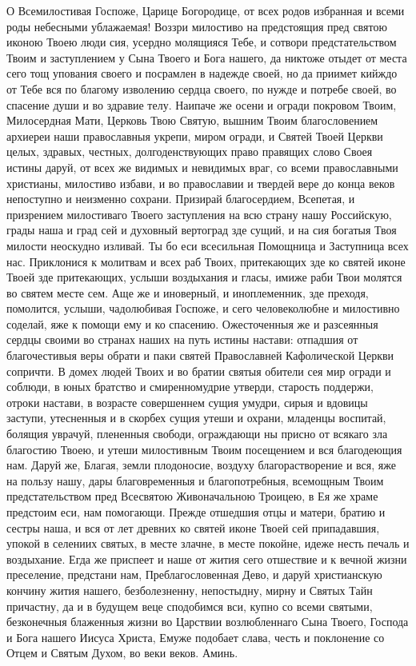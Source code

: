 \mychapterending

\begin{mymulticols}

О Всемилостивая Госпоже, Царице Богородице, от всех родов избранная и всеми роды небесными ублажаемая! Воззри милостиво на предстоящия пред святою иконою Твоею люди сия, усердно молящияся Тебе, и сотвори предстательством Твоим и заступлением у Сына Твоего и Бога нашего, да никтоже отыдет от места сего тощ упования своего и посрамлен в надежде своей,  но да приимет кийждо от Тебе вся по благому изволению сердца своего, по нужде и потребе своей, во спасение души и во здравие телу. Наипаче же осени и огради покровом Твоим, Милосердная Мати, Церковь Твою Святую, вышним Твоим благословением архиереи наши православныя укрепи, миром огради, и Святей Твоей Церкви целых, здравых, честных, долгоденствующих право правящих слово Своея истины даруй, от всех же видимых и невидимых враг, со всеми православными христианы, милостиво избави, и во православии и твердей вере до конца веков непоступно и неизменно сохрани. Призирай благосердием, Всепетая, и призрением милостиваго Твоего заступления на всю страну нашу Российскую, грады наша и град сей и духовный вертоград зде сущий, и на сия богатыя Твоя милости неоскудно изливай. Ты бо еси всесильная Помощница и Заступница всех нас. Приклонися к молитвам и всех раб Твоих, притекающих зде ко святей иконе Твоей зде притекающих, услыши воздыхания и гласы, имиже раби Твои молятся во святем месте сем. Аще же и иноверный, и иноплеменник, зде преходя, помолится, услыши, чадолюбивая Госпоже, и сего человеколюбне и милостивно соделай, яже к помощи ему и ко спасению. Ожесточенныя же и разсеянныя сердцы своими во странах наших на путь истины настави: отпадшия от благочестивыя веры обрати и паки святей Православней Кафолической Церкви сопричти. В домех людей Твоих и во братии святыя обители сея  мир огради и соблюди, в юных братство и смиренномудрие утверди, старость поддержи, отроки настави, в возрасте совершеннем сущия умудри, сирыя и вдовицы заступи, утесненныя и в скорбех сущия утеши и охрани, младенцы воспитай, болящия уврачуй, плененныя свободи, ограждающи ны присно от всякаго зла благостию Твоею, и утеши милостивным Твоим посещением и вся благодеющия нам. Даруй же, Благая, земли плодоносие, воздуху благорастворение и вся, яже на пользу нашу, дары благовременныя и благопотребныя, всемощным Твоим предстательством пред Всесвятою Живоначальною Троицею, в Ея же храме предстоим еси, нам помогающи. Прежде отшедшия отцы и матери, братию и сестры наша, и вся от лет древних ко святей иконе Твоей сей припадавшия, упокой в селениих святых, в месте злачне, в месте покойне, идеже несть печаль и воздыхание. Егда же приспеет и наше от жития сего отшествие и к вечной жизни преселение, предстани нам, Преблагословенная Дево, и даруй христианскую кончину жития нашего, безболезненну, непостыдну, мирну и Святых Тайн причастну, да и в будущем веце сподобимся вси, купно со всеми святыми, безконечныя блаженныя жизни во Царствии возлюбленнаго Сына Твоего, Господа и Бога нашего Иисуса Христа, Емуже подобает слава, честь и поклонение со Отцем и Святым Духом, во веки веков. Аминь.


\end{mymulticols}
